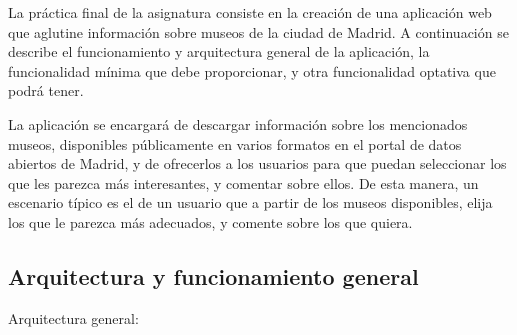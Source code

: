La práctica final de la asignatura consiste en la creación de una aplicación web que aglutine información sobre museos de la ciudad de Madrid. A continuación se describe el funcionamiento y arquitectura general de la aplicación, la funcionalidad mínima que debe proporcionar, y otra funcionalidad optativa que podrá tener.

La aplicación se encargará de descargar información sobre los mencionados museos, disponibles públicamente en varios formatos en el portal de datos abiertos de Madrid, y de ofrecerlos a los usuarios para que puedan seleccionar los que les parezca más interesantes, y comentar sobre ellos. De esta manera, un escenario típico es el de un usuario que a partir de los museos disponibles, elija los que le parezca más adecuados, y comente sobre los que quiera.

\subsection{Arquitectura y funcionamiento general}

Arquitectura general:

